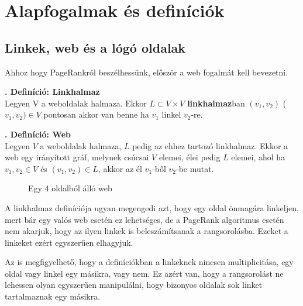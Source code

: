 \documentclass[12pt,a4paper]{article}
\newcounter{definicioszam}
\newenvironment{definicio}[1]
{{\medskip}\noindent \stepcounter{definicioszam}
{\bfseries{\thedefinicioszam. Definíció: #1\\[1ex]}}}{\bigskip }
\begin{document}
\section{Alapfogalmak és definíciók}

\subsection{Linkek, web és a lógó oldalak}\label{link_web_logooldal}

Ahhoz hogy PageRankról beszélhessünk, először a web fogalmát kell bevezetni.

\begin{definicio}{Linkhalmaz}
	Legyen V a weboldalak halmaza. Ekkor $L \subset V \times V$ \textbf{linkhalmaz}ban $(v_1,v_2) $ ($v_1, v_2) \in V$ pontosan akkor van benne ha $v_1$ linkel $v_2$-re. 
\end{definicio}

\begin{definicio}{Web}
	Legyen $V$ a weboldalak halmaza, $L$ pedig az ehhez tartozó linkhalmaz. Ekkor a web egy irányított gráf, melynek csúcsai $V$ elemei, élei pedig $L$ elemei, ahol ha $v_1, v_2 \in V$ és $(v_1,v_2) \in L$, akkor az él $v_1$-ből $v_2$-be mutat. 
\end{definicio}

\begin{figure}[h]
	\centering
	\caption{Egy 4 oldalból álló web}
\end{figure}

A linkhalmaz definíciója ugyan megengedi azt, hogy egy oldal önmagára linkeljen, mert bár egy valós web esetén ez lehetséges, de a PageRank algoritmus esetén nem akarjuk, hogy az ilyen linkek is beleszámítsanak a rangsorolásba. Ezeket a linkeket ezért egyszerűen elhagyjuk.

Az is megfigyelhető, hogy a definíciókban a linkeknek nincsen multiplicitása, egy oldal vagy linkel egy másikra, vagy nem. Ez azért van, hogy a rangsorolást ne lehessen olyan egyszerűen manipulálni, hogy bizonyos oldalak sok linket tartalmaznak egy másikra.  
\end{document}

